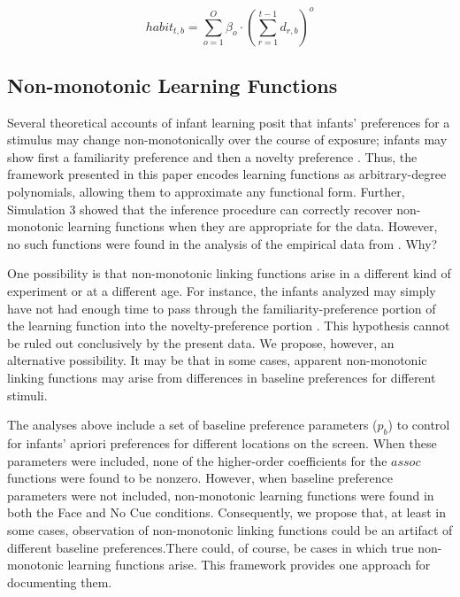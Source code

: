 \documentclass[12pt]{article}
\begin{document}
\begin{equation}\label{eq:habit}
habit_{t,b} = \sum_{o=1}^{O} \beta_{o} \cdot \left( \sum_{r=1}^{t-1} d_{r,b}\right) ^o
\end{equation}
	  	
\subsection*{Non-monotonic Learning Functions}

	Several theoretical accounts of infant learning posit that infants' preferences for a stimulus may change non-monotonically over the course of exposure; infants may show first a familiarity preference and then a novelty preference \cite{Hunter1988, Roder2000, Cohen2004}. Thus, the framework presented in this paper encodes learning functions as arbitrary-degree polynomials, allowing them to approximate any functional form. Further, Simulation 3 showed that the inference procedure can correctly recover non-monotonic learning functions when they are appropriate for the data. However, no such functions were found in the analysis of the empirical data from \cite{Wu2010a}. Why? 

	One possibility is that non-monotonic linking functions arise in a different kind of experiment or at a different age. For instance, the infants analyzed may simply have not had enough time to pass through the familiarity-preference portion of the learning function into the novelty-preference portion \cite{Hunter1988}. This hypothesis cannot be ruled out conclusively by the present data. We propose, however, an alternative possibility. It may be that in some cases, apparent non-monotonic linking functions may arise from differences in baseline preferences for different stimuli.

	The analyses above include a set of baseline preference parameters ($p_{b}$) to control for infants' apriori preferences for different locations on the screen. When these parameters were included, none of the higher-order coefficients for the $assoc$ functions were found to be nonzero. However, when baseline preference parameters were not included, non-monotonic learning functions were found in both the Face and No Cue conditions. Consequently, we propose that, at least in some cases, observation of non-monotonic linking functions could be an artifact of different baseline preferences.There could, of course, be cases in which true non-monotonic learning functions arise. This framework provides one approach for documenting them.
\end{document}
